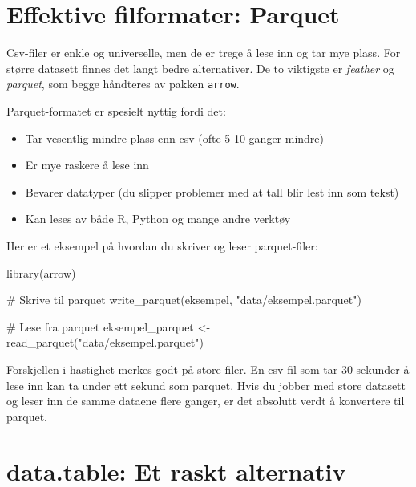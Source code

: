 \documentclass[
  norsk,
  letterpaper,
  DIV=11,
  numbers=noendperiod]{scrreprt}
\newenvironment{Shaded}{\begin{snugshade}}{\end{snugshade}}
\newcommand{\CommentTok}[1]{\textcolor[rgb]{0.37,0.37,0.37}{#1}}
\newcommand{\FunctionTok}[1]{\textcolor[rgb]{0.28,0.35,0.67}{#1}}
\newcommand{\NormalTok}[1]{\textcolor[rgb]{0.00,0.23,0.31}{#1}}
\newcommand{\OtherTok}[1]{\textcolor[rgb]{0.00,0.23,0.31}{#1}}
\newcommand{\StringTok}[1]{\textcolor[rgb]{0.13,0.47,0.30}{#1}}
\providecommand{\tightlist}{%
  \setlength{\itemsep}{0pt}\setlength{\parskip}{0pt}}
\theoremstyle{definition}
\theoremstyle{remark}
\begin{document}
\section{Effektive filformater:
Parquet}\label{effektive-filformater-parquet}

Csv-filer er enkle og universelle, men de er trege å lese inn og tar mye
plass. For større datasett finnes det langt bedre alternativer. De to
viktigste er \emph{feather} og \emph{parquet}, som begge håndteres av
pakken \texttt{arrow}.

Parquet-formatet er spesielt nyttig fordi det:

\begin{itemize}
\tightlist
\item
  Tar vesentlig mindre plass enn csv (ofte 5-10 ganger mindre)
\item
  Er mye raskere å lese inn
\item
  Bevarer datatyper (du slipper problemer med at tall blir lest inn som
  tekst)
\item
  Kan leses av både R, Python og mange andre verktøy
\end{itemize}

Her er et eksempel på hvordan du skriver og leser parquet-filer:

\begin{Shaded}
\begin{Highlighting}[]
\FunctionTok{library}\NormalTok{(arrow)}

\CommentTok{\# Skrive til parquet}
\FunctionTok{write\_parquet}\NormalTok{(eksempel, }\StringTok{"data/eksempel.parquet"}\NormalTok{)}

\CommentTok{\# Lese fra parquet}
\NormalTok{eksempel\_parquet }\OtherTok{\textless{}{-}} \FunctionTok{read\_parquet}\NormalTok{(}\StringTok{"data/eksempel.parquet"}\NormalTok{)}
\end{Highlighting}
\end{Shaded}

Forskjellen i hastighet merkes godt på store filer. En csv-fil som tar
30 sekunder å lese inn kan ta under ett sekund som parquet. Hvis du
jobber med store datasett og leser inn de samme dataene flere ganger, er
det absolutt verdt å konvertere til parquet.

\section{data.table: Et raskt
alternativ}\label{data.table-et-raskt-alternativ}
\end{document}
